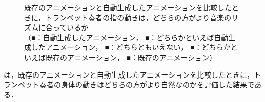 \begin{figure}[!h]
	\centering
	\hspace{5mm}
	\hspace{5mm}
	\caption{既存のアニメーションと自動生成したアニメーションを比較したときに，トランペット奏者の指の動きは，どちらの方がより音楽のリズムに合っているか\\
		（{\color{legend1}■}：自動生成したアニメーション，
		{\color{legend2}■}：どちらかといえば自動生成したアニメーション，
		{\color{legend3}■}：どちらともいえない，
		{\color{legend4}■}：どちらかといえば既存のアニメーション，
		{\color{legend5}■}：既存のアニメーション）}
	\label{fig:Q2-1}
\end{figure}
\newpage
\par
{}は，既存のアニメーションと自動生成したアニメーションを比較したときに，トランペット奏者の身体の動きはどちらの方がより自然なのかを評価した結果である．
